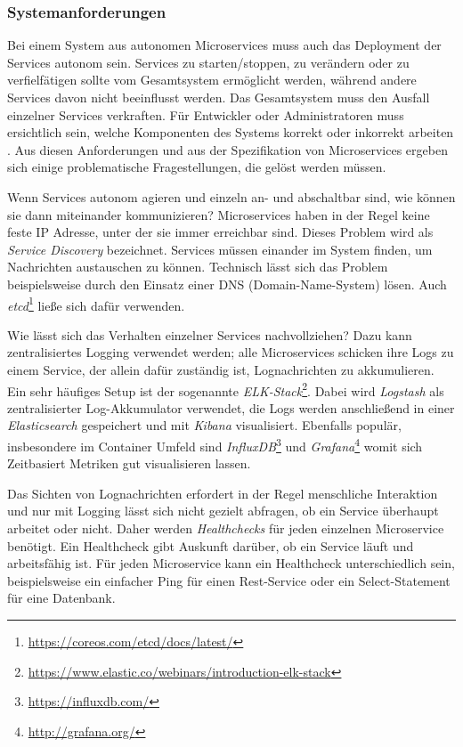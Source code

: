 \subsubsection{Systemanforderungen}

Bei einem System aus autonomen Microservices muss auch das Deployment der Services autonom sein. Services zu starten/stoppen, zu verändern oder zu verfielfätigen sollte vom Gesamtsystem ermöglicht werden, während andere Services davon nicht beeinflusst werden. Das Gesamtsystem muss den Ausfall einzelner Services verkraften. Für Entwickler oder Administratoren muss ersichtlich sein, welche Komponenten des Systems korrekt oder inkorrekt arbeiten \cite{newman2015}. Aus diesen Anforderungen und aus der Spezifikation von Microservices  ergeben sich einige problematische Fragestellungen, die gelöst werden müssen.

Wenn Services autonom agieren und einzeln an- und abschaltbar sind, wie können sie dann miteinander kommunizieren? Microservices haben in der Regel keine feste IP Adresse, unter der sie immer erreichbar sind. Dieses Problem wird als \textit{Service Discovery} bezeichnet. Services müssen einander im System finden, um Nachrichten austauschen zu können. Technisch lässt sich das Problem beispielsweise durch den Einsatz einer DNS (Domain-Name-System) lösen. Auch \textit{etcd}\footnote{\url{https://coreos.com/etcd/docs/latest/}} ließe sich dafür verwenden.

Wie lässt sich das Verhalten einzelner Services nachvollziehen? Dazu kann zentralisiertes Logging verwendet werden; alle Microservices schicken ihre Logs zu einem Service, der allein dafür zuständig ist, Lognachrichten zu akkumulieren. Ein sehr häufiges Setup ist der sogenannte \textit{ELK-Stack}\footnote{\url{https://www.elastic.co/webinars/introduction-elk-stack}}. Dabei wird \textit{Logstash} als zentralisierter Log-Akkumulator verwendet, die Logs werden anschließend in einer \textit{Elasticsearch} gespeichert und mit \textit{Kibana} visualisiert. Ebenfalls populär, insbesondere im Container Umfeld sind \textit{InfluxDB}\footnote{\url{https://influxdb.com/}} und \textit{Grafana}\footnote{\url{http://grafana.org/}} womit sich Zeitbasiert Metriken gut visualisieren lassen.

Das Sichten von Lognachrichten erfordert in der Regel menschliche Interaktion und nur mit Logging lässt sich nicht gezielt abfragen, ob ein Service überhaupt arbeitet oder nicht. Daher werden \textit{Healthchecks} für jeden einzelnen Microservice benötigt. Ein Healthcheck gibt Auskunft darüber, ob ein Service läuft und arbeitsfähig ist. Für jeden Microservice kann ein Healthcheck unterschiedlich sein, beispielsweise ein einfacher Ping für einen Rest-Service oder ein Select-Statement für eine Datenbank.

